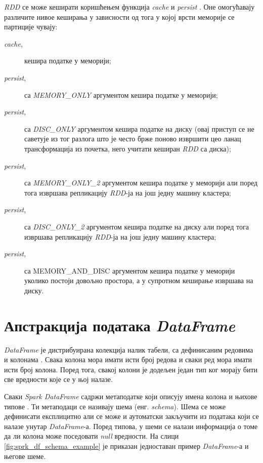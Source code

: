 \documentclass[12pt,oneside]{memoir}
\begin{document}
\textit{RDD} се може кеширати коришћењем функција \textit{cache} и \textit{persist} \cite{spark_rdd}. Оне омогућавају различите нивое кеширања у зависности од тога у којој врсти меморије се партиције чувају:

\begin{description}
	\item[\textit{cache},] кешира податке у меморији;

	\item[\textit{persist},] са \textit{MEMORY\_ONLY} аргументом кешира податке у меморији;

	\item[\textit{persist},] са \textit{DISC\_ONLY} аргументом кешира податке на диску (овај приступ се не саветује из тог разлога што је често брже поново извршити цео ланац трансформација из почетка, него учитати кеширан \textit{RDD} са диска);

	\item[\textit{persist},] са \textit{MEMORY\_ONLY\_2} аргументом кешира податке у меморији али поред тога извршава репликацију \textit{RDD}-ја на још једну машину кластера;

	\item[\textit{persist},] са \textit{DISC\_ONLY\_2} аргументом кешира податке на диску али поред тога извршава репликацију \textit{RDD}-ја на још једну машину кластера;

	\item[\textit{persist},] са {MEMORY\_AND\_DISC} аргументом кешира податке у меморији уколико постоји довољно простора, а у супротном кеширање извршава на диску.
\end{description}

\section{Апстракција података \textit{DataFrame}}
\label{sec:spark_df}

\textit{DataFrame} је дистрибуирана колекција налик табели, са дефинисаним редовима и колонама \cite{spark_guide}. Свака колона мора имати исти број редова и сваки ред мора имати исти број колона. Поред тога, свакој колони је додељен један тип ког морају бити све вредности које се у њој налазе.

Сваки \textit{Spark DataFrame} садржи метаподатке који описују имена колона и њихове типове  \cite{spark_guide}. Ти метаподаци се називају шема (енг. \textit{schema}). Шема се може дефинисати експлицитно али се може и аутоматски закључити из података који се налазе унутар \textit{DataFrame}-а. Поред типова, у шеми се налази информација о томе да ли колона може поседовати \textit{null} вредности. На слици \ref{fig:sprk_df_schema_example} је приказан једноставан пример \textit{DataFrame}-а и његове шеме.
\end{document}
